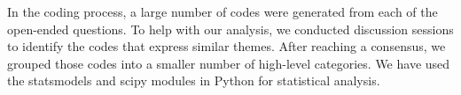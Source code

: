 In the coding process, a large number of codes were generated from each of the
open-ended questions. To help with our analysis, we conducted discussion
sessions to identify the codes that express similar themes. After reaching a
consensus, we grouped those codes into a smaller number of high-level
categories. We have used the statsmodels\citep{seabold2010} and
scipy\citep{scipy2020} modules in Python for statistical analysis. 

%
